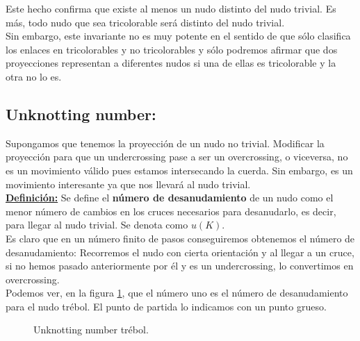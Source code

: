 Este hecho confirma que existe al menos un nudo distinto del nudo trivial. Es más, todo nudo que sea tricolorable será distinto del nudo trivial.\\

Sin embargo, este invariante no es muy potente en el sentido de que sólo clasifica los enlaces en tricolorables y no tricolorables y sólo podremos afirmar que dos proyecciones representan a diferentes nudos si una de ellas es tricolorable y la otra no lo es.   


\bigskip
\begin{center}
	\subsection{Unknotting number:}\label{subunk}
\end{center}
Supongamos que tenemos la proyección de un nudo no trivial. Modificar la proyección para que un undercrossing pase a ser un overcrossing, o viceversa, no es un movimiento válido pues estamos intersecando la cuerda. Sin embargo, es un movimiento interesante ya que nos llevará al nudo trivial. \\

\underline{\textbf{Definición:}}
Se define el \textbf{número de desanudamiento} de un nudo como el menor número de cambios en los cruces necesarios para desanudarlo, es decir, para llegar al nudo trivial. Se denota como $u(K)$. \\

Es claro que en un número finito de pasos conseguiremos obtenemos el número de desanudamiento: Recorremos el nudo con cierta orientación y al llegar a un cruce, si no hemos pasado anteriormente por él y es un undercrossing, lo convertimos en overcrossing. \\ 

Podemos ver, en la figura \ref{unk1}, que el número uno es el número de desanudamiento para el nudo trébol. El punto de partida lo indicamos con un punto grueso.
\begin{figure}[h!]
	\centering
	\caption{Unknotting number trébol.}
	\label{unk1} 
\end{figure}

